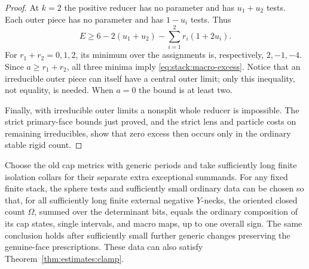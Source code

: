 \begin{proof}
At \(k=2\) the positive reducer has no parameter and has
\(u_1+u_2\) tests.  Each outer piece has no parameter and has
\(1-u_i\) tests.  Thus
\[
 E\ge6-2(u_1+u_2)-\sum_{i=1}^2r_i(1+2u_i).
\]
For \(r_1+r_2=0,1,2\), its minimum over the assignments is,
respectively, \(2,-1,-4\).  Since \(a\ge r_1+r_2\), all
three minima imply \eqref{eq:stack:macro-excess}.  Notice that
an irreducible outer piece can itself have a central outer limit;
only this inequality, not equality, is needed.  When \(a=0\)
the bound is at least two.

Finally, with irreducible outer limits a nonsplit whole reducer is
impossible.  The strict primary-face bounds just proved, and the
strict lens and particle costs on remaining irreducibles, show that
zero excess then occurs only in the ordinary stable rigid count.
\end{proof}

\begin{proposition}
\label{prop:stack:composition}
Choose the old cap metrics with generic periods and take sufficiently
long finite isolation collars for their separate extra exceptional
summands.  For any fixed finite stack, the sphere tests and sufficiently
small ordinary data can be chosen so that, for all sufficiently long
finite external negative \(Y\)-necks, the oriented closed count
\(\Omega\), summed over the determinant bits, equals the ordinary
composition of its cap states, single intervals, and macro maps, up
to one overall sign.  The same conclusion holds after sufficiently
small further generic changes preserving the genuine-face
prescriptions.  These data can also satisfy
Theorem~\ref{thm:estimates:clamp}.
\end{proposition}


